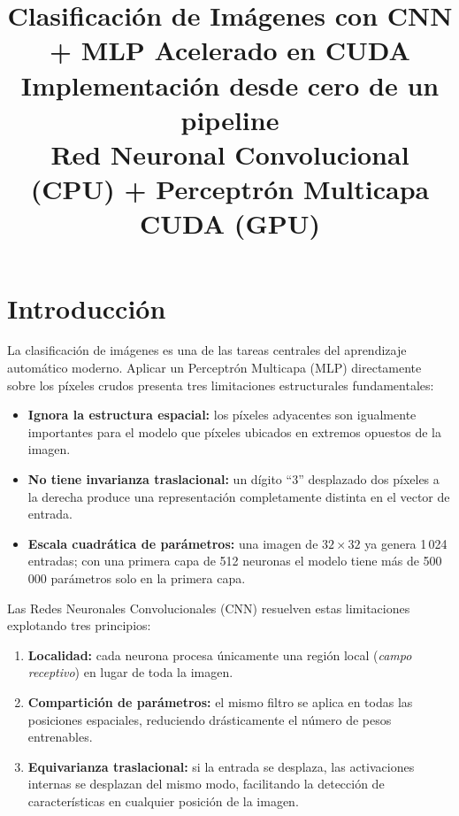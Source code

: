 \documentclass[12pt,a4paper]{article}
\title{%
  \textbf{Clasificación de Imágenes con CNN + MLP Acelerado en CUDA}\\[0.5em]
  \large Implementación desde cero de un pipeline\\
  Red Neuronal Convolucional (CPU) + Perceptrón Multicapa CUDA (GPU)
}
\author{}
\date{}
\begin{document}
\maketitle
\tableofcontents
\newpage

\section{Introducción}

La clasificación de imágenes es una de las tareas centrales del aprendizaje automático moderno.
Aplicar un Perceptrón Multicapa (MLP) directamente sobre los píxeles crudos presenta tres
limitaciones estructurales fundamentales:

\begin{itemize}[noitemsep]
  \item \textbf{Ignora la estructura espacial:} los píxeles adyacentes son igualmente
    importantes para el modelo que píxeles ubicados en extremos opuestos de la imagen.
  \item \textbf{No tiene invarianza traslacional:} un dígito ``3'' desplazado dos píxeles
    a la derecha produce una representación completamente distinta en el vector de entrada.
  \item \textbf{Escala cuadrática de parámetros:} una imagen de $32\times32$ ya genera
    1\,024 entradas; con una primera capa de 512 neuronas el modelo tiene más de 500\,000
    parámetros solo en la primera capa.
\end{itemize}

Las Redes Neuronales Convolucionales (CNN) resuelven estas limitaciones explotando tres
principios:

\begin{enumerate}[noitemsep]
  \item \textbf{Localidad:} cada neurona procesa únicamente una región local
    (\textit{campo receptivo}) en lugar de toda la imagen.
  \item \textbf{Compartición de parámetros:} el mismo filtro se aplica en todas las
    posiciones espaciales, reduciendo drásticamente el número de pesos entrenables.
  \item \textbf{Equivarianza traslacional:} si la entrada se desplaza, las activaciones
    internas se desplazan del mismo modo, facilitando la detección de características
    en cualquier posición de la imagen.
\end{enumerate}
\end{document}
